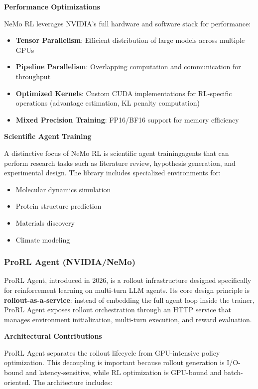 \textbf{Performance Optimizations}

NeMo RL leverages NVIDIA's full hardware and software stack for performance:

\begin{itemize}
    \item \textbf{Tensor Parallelism}: Efficient distribution of large models across multiple GPUs
    \item \textbf{Pipeline Parallelism}: Overlapping computation and communication for throughput
    \item \textbf{Optimized Kernels}: Custom CUDA implementations for RL-specific operations (advantage estimation, KL penalty computation)
    \item \textbf{Mixed Precision Training}: FP16/BF16 support for memory efficiency

\end{itemize}
\textbf{Scientific Agent Training}

A distinctive focus of NeMo RL is scientific agent trainingagents that can perform research tasks such as literature review, hypothesis generation, and experimental design. The library includes specialized environments for:

\begin{itemize}
    \item Molecular dynamics simulation
    \item Protein structure prediction
    \item Materials discovery
    \item Climate modeling

\end{itemize}
\subsubsection{ProRL Agent (NVIDIA/NeMo)}

ProRL Agent, introduced in 2026, is a rollout infrastructure designed specifically for reinforcement learning on multi-turn LLM agents. Its core design principle is \textbf{rollout-as-a-service}: instead of embedding the full agent loop inside the trainer, ProRL Agent exposes rollout orchestration through an HTTP service that manages environment initialization, multi-turn execution, and reward evaluation.

\textbf{Architectural Contributions}

ProRL Agent separates the rollout lifecycle from GPU-intensive policy optimization. This decoupling is important because rollout generation is I/O-bound and latency-sensitive, while RL optimization is GPU-bound and batch-oriented. The architecture includes:

